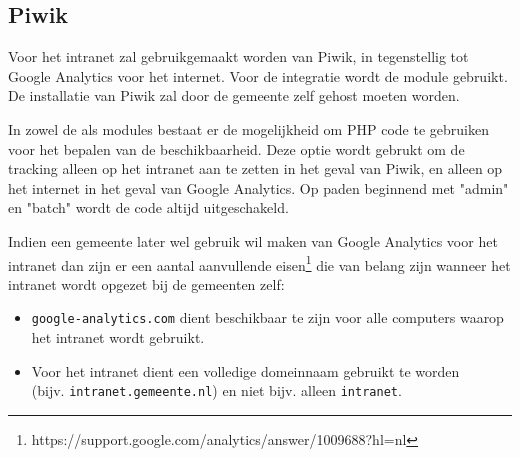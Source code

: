 \subsection{Piwik}\label{analyticsintranet}

Voor het intranet zal gebruikgemaakt worden van Piwik, in tegenstellig tot Google Analytics voor het internet. Voor de integratie wordt de  module gebruikt. De installatie van Piwik zal door de gemeente zelf gehost moeten worden.

In zowel de  als  modules bestaat er de mogelijkheid om PHP code te gebruiken voor het bepalen van de beschikbaarheid. Deze optie wordt gebrukt om de tracking alleen op het intranet aan te zetten in het geval van Piwik, en alleen op het internet in het geval van Google Analytics. Op paden beginnend met "admin" en "batch" wordt de code altijd uitgeschakeld.

Indien een gemeente later wel gebruik wil maken van Google Analytics voor het intranet dan zijn er een aantal aanvullende eisen\footnote{https://support.google.com/analytics/answer/1009688?hl=nl} die van belang zijn wanneer het intranet wordt opgezet bij de gemeenten zelf:
\begin{itemize}
\item \texttt{google-analytics.com} dient beschikbaar te zijn voor alle computers waarop het intranet wordt gebruikt.
\item Voor het intranet dient een volledige domeinnaam gebruikt te worden \\ (bijv. \texttt{intranet.gemeente.nl}) en niet bijv. alleen \texttt{intranet}.
\end{itemize}
